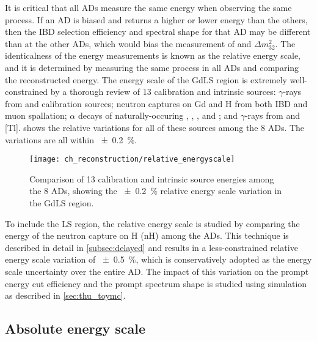 It is critical that all ADs measure the same energy when observing the same process.
If an AD is biased and returns a higher or lower energy than the others,
then the IBD selection efficiency and spectral shape for that AD
may be different than at the other ADs,
which would bias the measurement of \thetaot{} and $\Delta m^2_{32}$.
The identicalness of the energy measurements is known as the relative energy scale,
and it is determined by measuring the same process in all ADs and comparing
the reconstructed energy.
The energy scale of the GdLS region is extremely well-constrained
by a thorough review of 13 calibration and intrinsic sources:
$\gamma$-rays from  and  calibration sources;
neutron captures on Gd and H from both IBD and muon spallation;
$\alpha$ decays of naturally-occuring ,
, , and ;
and $\gamma$-rays from  and [Tl].
 shows the relative variations
for all of these sources among the 8 ADs.
The variations are all within \SI{+-0.2}{\percent}.

\begin{figure}
    \centering
    \texttt{[image: ch\_reconstruction/relative\_energyscale]}
    \caption[Relative energy scale for GdLS volume]{
        Comparison of 13 calibration and intrinsic source energies
        among the 8 ADs, showing the \SI{+-0.2}{\percent}
        relative energy scale variation in the GdLS region.
    }
    \label{fig:gdls_rel_energyscale}
\end{figure}

To include the LS region, the relative energy scale is studied
by comparing the energy of the neutron capture on H (nH)
among the ADs.
This technique is described in detail in \cref{subsec:delayed}
and results in a less-constrained relative energy scale variation
of \SI{+-0.5}{\percent}, which is conservatively adopted
as the energy scale uncertainty over the entire AD.
The impact of this variation on the prompt energy cut efficiency
and the prompt spectrum shape
is studied using simulation
as described in \cref{sec:thu_toymc}.

\subsection{Absolute energy scale}
\label{subsec:abs_energyscale}

